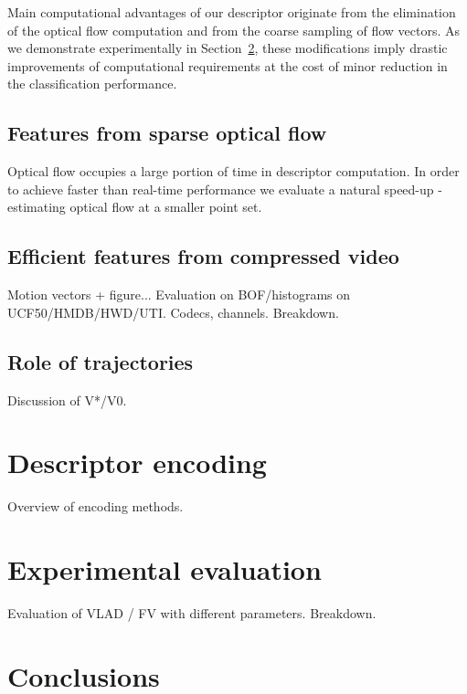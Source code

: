 \documentclass[10pt,twocolumn,letterpaper]{article}
\begin{document}
Main computational advantages of our descriptor originate from the elimination of the optical flow computation and from the coarse sampling of flow vectors. As we demonstrate experimentally in Section~\ref{sec:experiments}, these modifications imply drastic improvements of computational requirements at the cost of minor reduction in the classification performance. 
\subsection{Features from sparse optical flow}
Optical flow occupies a large portion of time in
descriptor computation. In order to achieve faster than
real-time
performance we evaluate a natural speed-up - estimating optical
flow
at a smaller point set.

\subsection{Efficient features from compressed video}
Motion vectors + figure... Evaluation on BOF/histograms on
UCF50/HMDB/HWD/UTI. Codecs, channels. Breakdown.


\subsection{Role of trajectories}
Discussion of V*/V0.


\section{Descriptor encoding}
\label{sec:quantization}
Overview of encoding methods.

\section{Experimental evaluation}
\label{sec:experiments}
Evaluation of VLAD / FV with different parameters. Breakdown.


\section{Conclusions}




{
\small


}
\end{document}
